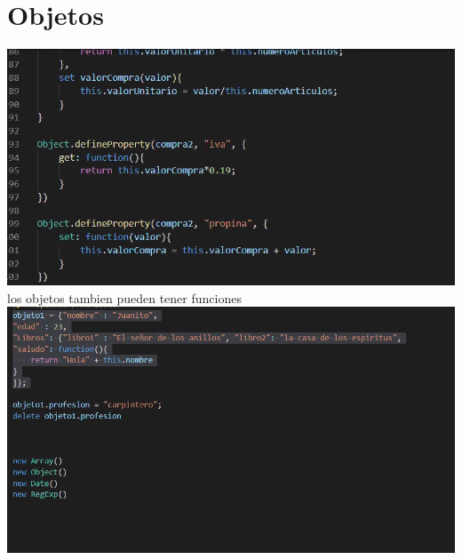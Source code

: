 \documentclass[10pt,a4paper]{article} %
\begin{document}
    \section{Objetos}
       \includegraphics[width=0.8\linewidth]{objetos.png}
       \\
       los objetos tambien pueden tener funciones
       \\
       \includegraphics[width=0.8\linewidth]{clase.png}
       \\
\end{document}
